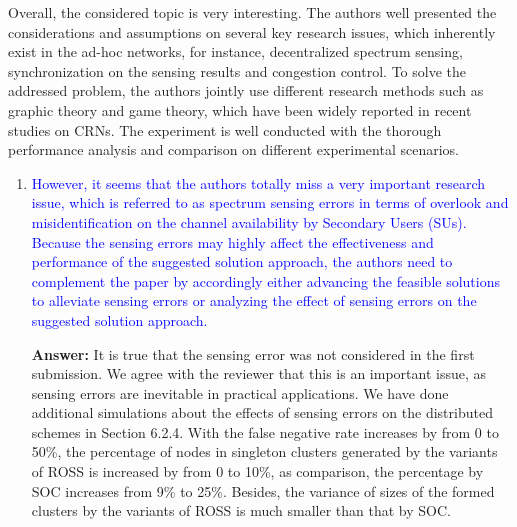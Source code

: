 \documentclass[10pt,a4paper]{article}
\begin{document}
Overall, the considered topic is very interesting. The authors well presented the considerations and assumptions on several key research issues, which inherently exist in the ad-hoc networks, for instance, decentralized spectrum sensing, synchronization on the sensing results and congestion control. To solve the addressed problem, the authors jointly use different research methods such as graphic theory and game theory, which have been widely reported in recent studies on CRNs. The experiment is well conducted with the thorough performance analysis and comparison on different experimental scenarios.
\begin{enumerate}
\item \textcolor{blue}{ However, it seems that the authors totally miss a very important research issue, which is referred to as spectrum sensing errors in terms of overlook and misidentification on the channel availability by Secondary Users (SUs). Because the sensing errors may highly affect the effectiveness and performance of the suggested solution approach, the authors need to complement the paper by accordingly either advancing the feasible solutions to alleviate sensing errors or analyzing the effect of sensing errors on the suggested solution approach.}

 \textbf{Answer:} It is true that the sensing error was not considered in the first submission.
We agree with the reviewer that this is an important issue, as sensing errors are inevitable in practical applications.
We have done additional simulations about the effects of sensing errors on the distributed schemes in Section 6.2.4.
With the false negative rate increases by from 0 to 50\%, the percentage of nodes in singleton clusters generated by the variants of ROSS is increased by from 0 to 10\%, as comparison, the percentage by SOC increases from 9\% to 25\%.
Besides, the variance of sizes of the formed clusters by the variants of ROSS is much smaller than that by SOC.
\end{enumerate}

%


\end{document}
